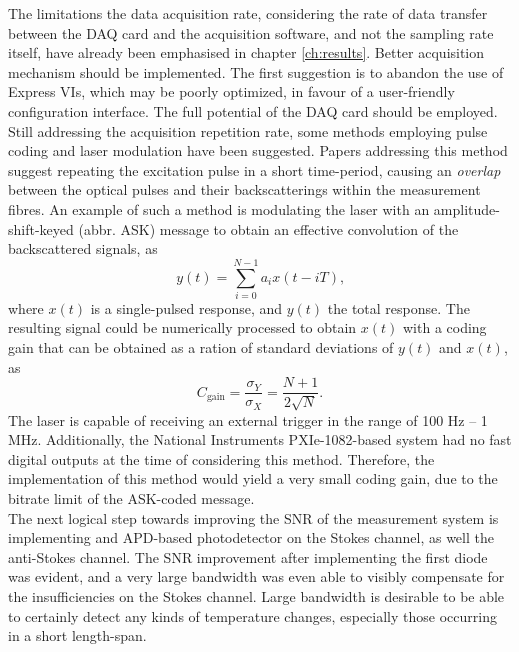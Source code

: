 \documentclass{standalone}
\begin{document}
The limitations the data acquisition rate, considering the rate of data transfer between the DAQ card and the acquisition software, and not the sampling rate itself, have already been emphasised in chapter \ref{ch:results}. Better acquisition mechanism should be implemented. The first suggestion is to abandon the use of Express VIs, which may be poorly optimized, in favour of a user-friendly configuration interface. The full potential of the DAQ card should be employed. \\

Still addressing the acquisition repetition rate, some methods employing pulse coding and laser modulation have been suggested. Papers addressing this method suggest repeating the excitation pulse in a short time-period, causing an \textit{overlap} between the optical pulses and their backscatterings within the measurement fibres. An example of such a method is modulating the laser with an amplitude-shift-keyed (abbr. ASK) message to obtain an effective convolution of the backscattered signals, as
\begin{equation}
y(t) = \sum_{i = 0}^{N-1} a_i x(t - iT) \textrm{,}
\end{equation}
where $x(t)$ is a single-pulsed response, and $y(t)$ the total response. The resulting signal could be numerically processed to obtain $x(t)$ with a coding gain that can be obtained as a ration of standard deviations of $y(t)$ and $x(t)$, as
\begin{equation}
C_\textrm{gain} = \frac{\sigma_Y}{\sigma_X} = \frac{N+1}{2 \sqrt{N}} \textrm{.}
\end{equation}
The laser is capable of receiving an external trigger in the range of 100 Hz -- 1 MHz. Additionally, the National Instruments PXIe-1082-based system had no fast digital outputs at the time of considering this method. Therefore, the implementation of this method would yield a very small coding gain, due to the bitrate limit of the ASK-coded message. \\

The next logical step towards improving the SNR of the measurement system is implementing and APD-based photodetector on the Stokes channel, as well the anti-Stokes channel. The SNR improvement after implementing the first diode was evident, and a very large bandwidth was even able to visibly compensate for the insufficiencies on the Stokes channel. Large bandwidth is desirable to be able to certainly detect any kinds of temperature changes, especially those occurring in a short length-span.


\setcounter{stranica}{\thepage}
\addtocounter{stranica}{1}
\end{document}
